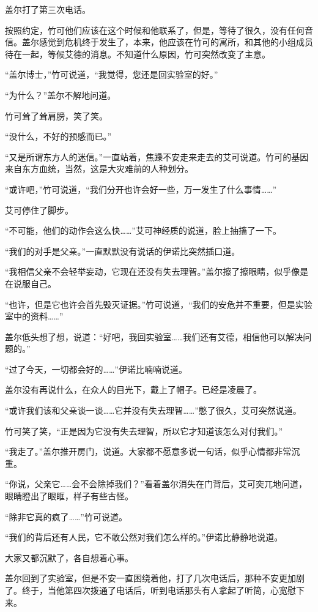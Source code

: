 盖尔打了第三次电话。

按照约定，竹可他们应该在这个时候和他联系了，但是，等待了很久，没有任何音信。盖尔感觉到危机终于发生了，本来，他应该在竹可的寓所，和其他的小组成员待在一起，等候艾德的消息。不知道什么原因，竹可突然改变了主意。

“盖尔博士，”竹可说道，“我觉得，您还是回实验室的好。”

“为什么？”盖尔不解地问道。

竹可耸了耸肩膀，笑了笑。

“没什么，不好的预感而已。”

“又是所谓东方人的迷信。”一直站着，焦躁不安走来走去的艾可说道。竹可的基因来自东方血统，当然，这是大灾难前的人种划分。

“或许吧，”竹可说道，“我们分开也许会好一些，万一发生了什么事情……”

艾可停住了脚步。

“不可能，他们的动作会这么快……”艾可神经质的说道，脸上抽搐了一下。

“我们的对手是父亲。”一直默默没有说话的伊诺比突然插口道。

“我相信父亲不会轻举妄动，它现在还没有失去理智。”盖尔擦了擦眼睛，似乎像是在说服自己。

“也许，但是它也许会首先毁灭证据。”竹可说道，“我们的安危并不重要，但是实验室中的资料……”

盖尔低头想了想，说道：“好吧，我回实验室……我们还有艾德，相信他可以解决问题的。”

“过了今天，一切都会好的……”伊诺比喃喃说道。

盖尔没有再说什么，在众人的目光下，戴上了帽子。已经是凌晨了。

“或许我们该和父亲谈一谈……它并没有失去理智……”憋了很久，艾可突然说道。

竹可笑了笑，“正是因为它没有失去理智，所以它才知道该怎么对付我们。”

“我走了。”盖尔推开房门，说道。大家都不愿意多说一句话，似乎心情都非常沉重。

“你说，父亲它……会不会除掉我们？”看着盖尔消失在门背后，艾可突兀地问道，眼睛瞪出了眼眶，样子有些古怪。

“除非它真的疯了……”竹可说道。

“我们的背后还有人民，它不敢公然对我们怎么样的。”伊诺比静静地说道。

大家又都沉默了，各自想着心事。

盖尔回到了实验室，但是不安一直困绕着他，打了几次电话后，那种不安更加剧了。终于，当他第四次拨通了电话后，听到电话那头有人拿起了听筒，心宽慰下来。

